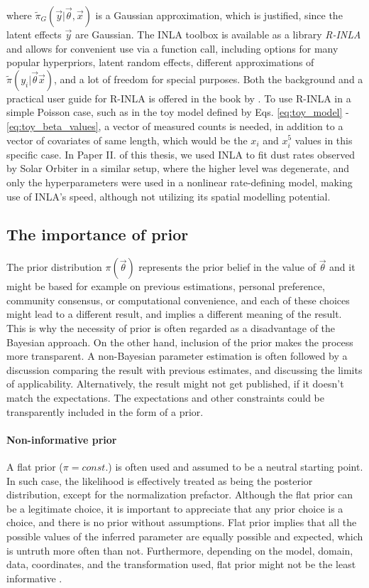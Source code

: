 where $\tilde{\pi}_G(\vec{y}|\vec{\theta},\vec{x})$ is a Gaussian approximation, which is justified, since the latent effects $\vec{y}$ are Gaussian. The INLA toolbox is available as a library \textit{R-INLA} \citep{rinla} and allows for convenient use via a function call, including options for many popular hyperpriors, latent random effects, different approximations of $\tilde{\pi}(y_i|\vec{\theta} \vec{x})$, and a lot of freedom for special purposes. Both the background and a practical user guide for R-INLA is offered in the book by \citeauthor{gomez2020bayesian} \citep{gomez2020bayesian}. To use R-INLA in a simple Poisson case, such as in the toy model defined by Eqs. \ref{eq:toy_model} - \ref{eq:toy_beta_values}, a vector of measured counts is needed, in addition to a vector of covariates of same length, which would be the $x_i$ and $x_i^5$ values in this specific case. In Paper II. of this thesis, we used INLA to fit dust rates observed by Solar Orbiter in a similar setup, where the higher level was degenerate, and only the hyperparameters were used in a nonlinear rate-defining model, making use of INLA's speed, although not utilizing its spatial modelling potential. 

\subsection{The importance of prior}

The prior distribution $\pi(\vec{\theta})$ represents the prior belief in the value of $\vec{\theta}$ and it might be based for example on previous estimations, personal preference, community consensus, or computational convenience, and each of these choices might lead to a different result, and implies a different meaning of the result. This is why the necessity of prior is often regarded as a disadvantage of the Bayesian approach. On the other hand, inclusion of the prior makes the process more transparent. A non-Bayesian parameter estimation is often followed by a discussion comparing the result with previous estimates, and discussing the limits of applicability. Alternatively, the result might not get published, if it doesn't match the expectations. The expectations and other constraints could be transparently included in the form of a prior.

\paragraph{Non-informative prior} A flat prior ($\pi = const.$) is often used and assumed to be a neutral starting point. In such case, the likelihood is effectively treated as being the posterior distribution, except for the normalization prefactor. Although the flat prior can be a legitimate choice, it is important to appreciate that any prior choice is a choice, and there is no prior without assumptions. Flat prior implies that all the possible values of the inferred parameter are equally possible and expected, which is untruth more often than not. Furthermore, depending on the model, domain, data, coordinates, and the transformation used, flat prior might not be the least informative \citep{lemoine2019moving}.

